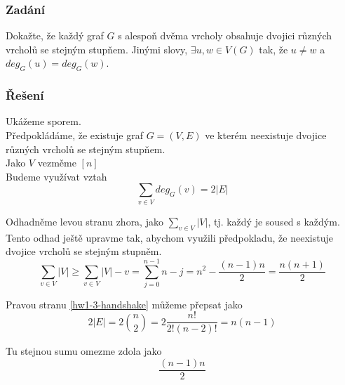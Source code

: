 \documentclass[../main.tex]{subfiles}
\begin{document}
\subsubsection*{Zadání}
Dokažte, že každý graf $G$ s alespoň dvěma vrcholy obsahuje dvojici různých vrcholů se stejným stupňem. Jinými slovy, $\exists u,w \in V(G)$
tak, že $u\neq w$ a $deg_G(u) = deg_G(w)$.
\subsubsection*{Řešení}

Ukážeme sporem. \\Předpokládáme, že existuje graf $G = (V,E)$ ve kterém neexistuje dvojice různých vrcholů se stejným stupňem.\\
Jako $V$ vezměme $[n]$\\
Budeme využívat vztah 
\begin{equation}\label{hw1-3-handshake}
    \sum_{v\in V} deg_G (v) = 2|E|
\end{equation}


Odhadněme levou stranu zhora, jako $\sum_{v\in V} |V|$, tj. každý je soused s každým.\\
Tento odhad ještě upravme tak, abychom využili předpokladu, že neexistuje dvojice vrcholů se stejným stupněm.\\
\begin{equation*}
    \sum_{v\in V} |V| \geq \sum_{v\in V} |V| - v =  \sum_{j=0}^{n-1} n - j = n^2 - \frac{(n-1)n}{2} = \frac{n(n+1)}{2}
\end{equation*}

Pravou stranu \eqref{hw1-3-handshake} můžeme přepsat jako 
\begin{equation*}
    2|E| = 2 \binom{n}{2} = 2 \frac{n!}{2! (n-2)!} = n(n-1)
\end{equation*}

Tu stejnou sumu omezme zdola jako
\begin{equation*}
    \frac{(n-1)n}{2}
\end{equation*}
\end{document}
